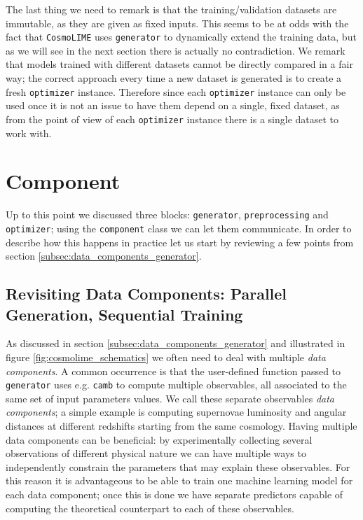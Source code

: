 The last thing we need to remark is that the training/validation datasets are immutable, as they are given as fixed inputs. This seems to be at odds with the fact that \texttt{CosmoLIME} uses \texttt{generator} to dynamically extend the training data, but as we will see in the next section there is actually no contradiction. We remark that models trained with different datasets cannot be directly compared in a fair way; the correct approach every time a new dataset is generated is to create a fresh \texttt{optimizer} instance. Therefore since each \texttt{optimizer} instance can only be used once it is not an issue to have them depend on a single, fixed dataset, as from the point of view of each \texttt{optimizer} instance there is a single dataset to work with.


\section{Component}
Up to this point we discussed three blocks: \texttt{generator}, \texttt{preprocessing} and \texttt{optimizer}; using the \texttt{component} class we can let them communicate. In order to describe how this happens in practice let us start by reviewing a few points from section \ref{subsec:data_components_generator}.
\subsection{Revisiting Data Components: Parallel Generation, Sequential Training}\label{subsec:data_components_component}
As discussed in section \ref{subsec:data_components_generator} and illustrated in figure \ref{fig:cosmolime_schematics} we often need to deal with multiple \emph{data components}. A common occurrence is that the user-defined function passed to \texttt{generator} uses e.g. \texttt{camb} to compute multiple observables, all associated to the same set of input parameters values. We call these separate observables \emph{data components}; a simple example is computing supernovae luminosity and angular distances at different redshifts starting from the same cosmology. Having multiple data components can be beneficial: by experimentally collecting several observations of different physical nature we can have multiple ways to independently constrain the parameters that may explain these observables. For this reason it is advantageous to be able to train one machine learning model for each data component; once this is done we have separate predictors capable of computing the theoretical counterpart to each of these observables.

